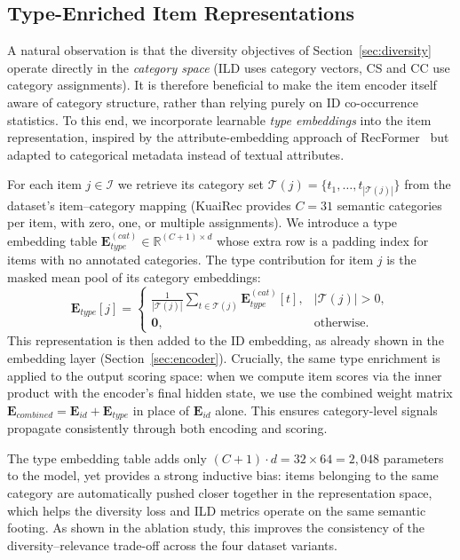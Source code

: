 \subsection{Type-Enriched Item Representations}
\label{sec:type_embeddings}
A natural observation is that the diversity objectives of Section~\ref{sec:diversity} operate directly in the \emph{category space} (ILD uses category vectors, CS and CC use category assignments). It is therefore beneficial to make the item encoder itself aware of category structure, rather than relying purely on ID co-occurrence statistics. To this end, we incorporate learnable \emph{type embeddings} into the item representation, inspired by the attribute-embedding approach of RecFormer~\cite{li2023text} but adapted to categorical metadata instead of textual attributes.

For each item $j \in \mathcal{I}$ we retrieve its category set $\mathcal{T}(j) = \{t_1, \dots, t_{|\mathcal{T}(j)|}\}$ from the dataset's item--category mapping (KuaiRec provides $C=31$ semantic categories per item, with zero, one, or multiple assignments). We introduce a type embedding table $\mathbf{E}_{type}^{(cat)} \in \mathbb{R}^{(C+1) \times d}$ whose extra row is a padding index for items with no annotated categories. The type contribution for item $j$ is the masked mean pool of its category embeddings:
\begin{equation}
\mathbf{E}_{type}[j] =
\begin{cases}
\frac{1}{|\mathcal{T}(j)|} \sum_{t \in \mathcal{T}(j)} \mathbf{E}_{type}^{(cat)}[t], & |\mathcal{T}(j)| > 0, \\
\mathbf{0}, & \text{otherwise}.
\end{cases}
\end{equation}
This representation is then added to the ID embedding, as already shown in the embedding layer (Section~\ref{sec:encoder}). Crucially, the same type enrichment is applied to the output scoring space: when we compute item scores via the inner product with the encoder's final hidden state, we use the combined weight matrix $\mathbf{E}_{combined} = \mathbf{E}_{id} + \mathbf{E}_{type}$ in place of $\mathbf{E}_{id}$ alone. This ensures category-level signals propagate consistently through both encoding and scoring.

The type embedding table adds only $(C+1) \cdot d = 32 \times 64 = 2{,}048$ parameters to the model, yet provides a strong inductive bias: items belonging to the same category are automatically pushed closer together in the representation space, which helps the diversity loss and ILD metrics operate on the same semantic footing. As shown in the ablation study, this improves the consistency of the diversity--relevance trade-off across the four dataset variants.
